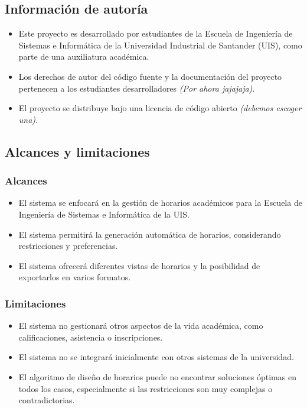 \documentclass{article} %
\begin{document}
\subsection{Información de autoría}
\begin{itemize}
    \item Este proyecto es desarrollado por estudiantes de la Escuela de Ingeniería de Sistemas e Informática de la Universidad Industrial de Santander (UIS), como parte de una auxiliatura académica.
    \item Los derechos de autor del código fuente y la documentación del proyecto pertenecen a los estudiantes desarrolladores \textit{(Por ahora jajajaja)}.
    \item El proyecto se distribuye bajo una licencia de código abierto \textit{(debemos escoger una)}.
\end{itemize}

\subsection{Alcances y limitaciones}
    \subsubsection{Alcances}
    \begin{itemize}
        \item El sistema se enfocará en la gestión de horarios académicos para la Escuela de Ingeniería de Sistemas e Informática de la UIS.
        \item El sistema permitirá la generación automática de horarios, considerando restricciones y preferencias.
        \item El sistema ofrecerá diferentes vistas de horarios y la posibilidad de exportarlos en varios formatos.
    \end{itemize}
    
    \subsubsection{Limitaciones}
    \begin{itemize}
        \item El sistema no gestionará otros aspectos de la vida académica, como calificaciones, asistencia o inscripciones.
        \item El sistema no se integrará inicialmente con otros sistemas de la universidad.
        \item El algoritmo de diseño de horarios puede no encontrar soluciones óptimas en todos los casos, especialmente si las restricciones son muy complejas o contradictorias.
    \end{itemize}
\end{document}
